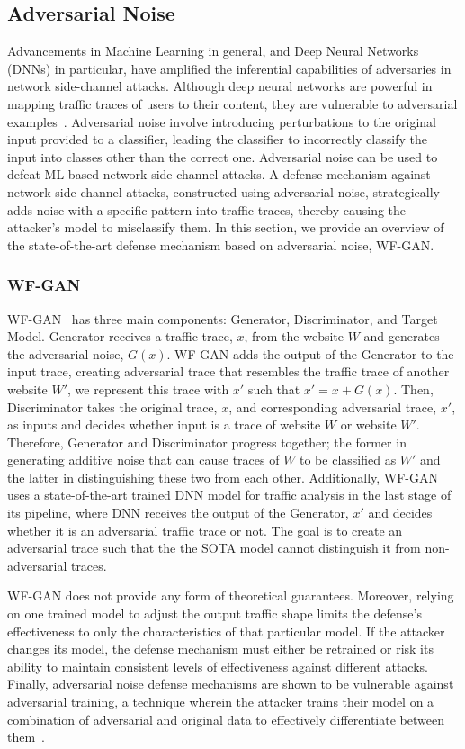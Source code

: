 \subsection{Adversarial Noise}
Advancements in Machine Learning in general, and Deep Neural Networks (DNNs) in particular, have amplified the inferential capabilities of adversaries in network side-channel attacks\cite{sirinam2018df}.
Although deep neural networks are powerful in mapping traffic traces of users to their content, they are vulnerable to adversarial examples~\cite{goodfellow2014explaining}.
Adversarial noise involve introducing perturbations to the original input provided to a classifier, leading the classifier to incorrectly classify the input into classes other than the correct one.
Adversarial noise can be used to defeat ML-based network side-channel attacks.
A defense mechanism against network side-channel attacks, constructed using adversarial noise, strategically adds noise with a specific pattern into traffic traces, thereby causing the attacker's model to misclassify them.
In this section, we provide an overview of the state-of-the-art defense mechanism based on adversarial noise, WF-GAN. 

\subsubsection{WF-GAN}
WF-GAN~\cite{hou2020wf} has three main components: Generator, Discriminator, and Target Model.
Generator receives a traffic trace, $x$, from the website $W$ and generates the adversarial noise, $G(x)$. 
WF-GAN adds the output of the Generator to the input trace, creating adversarial trace that resembles the traffic trace of another website $W'$, we represent this trace with $x'$ such that $x'=x + G(x)$.
Then, Discriminator takes the original trace, $x$, and corresponding adversarial trace, $x'$, as inputs and decides whether input is a trace of website $W$ or website $W'$.
Therefore, Generator and Discriminator progress together; the former in generating additive noise that can cause traces of $W$ to be classified as $W'$ and the latter in distinguishing these two from each other.
Additionally, WF-GAN uses a state-of-the-art trained DNN model for traffic analysis in the last stage of its pipeline, where DNN receives the output of the Generator, $x'$ and decides whether it is an adversarial traffic trace or not. 
The goal is to create an adversarial trace such that the the SOTA model cannot distinguish it from non-adversarial traces.

WF-GAN does not provide any form of theoretical guarantees. 
Moreover, relying on one trained model to adjust the output traffic shape limits the defense's effectiveness to only the characteristics of that particular model.
If the attacker changes its model, the defense mechanism must either be retrained or risk its ability to maintain consistent levels of effectiveness against different attacks.
Finally, adversarial noise defense mechanisms are shown to be vulnerable against adversarial training, a technique wherein the attacker trains their model on a combination of adversarial and original data to effectively differentiate between them~\cite{zhang2019statistical}.
